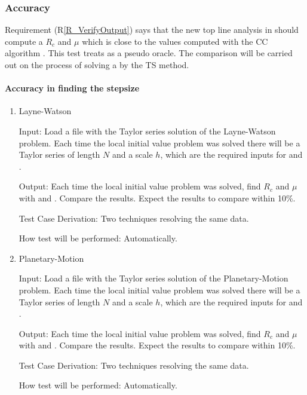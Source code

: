 \documentclass[12pt, titlepage]{article}
\newcommand{\rref}[1]{(R\ref{#1})}
\begin{document}
\subsubsection{Accuracy}

Requirement \rref{R_VerifyOutput} says that the new top line
analysis in  should compute a $R_c$ and $\mu$ which is
close to the values computed with the CC algorithm \rdcon.
This test treats \rdcon as a pseudo oracle.
The comparison will be carried out on the process of solving a \dae \ivp by the TS method.

\paragraph{Accuracy in finding the stepsize}

\begin{enumerate}

\item{Layne-Watson\\}

					
					
Input: Load a file with the Taylor series solution of the Layne-Watson problem. Each time the
    local initial value problem was solved there will be a Taylor series of length $N$ and a scale $h$,
    which are the required inputs for  and \rdcon.
					
Output: Each time the local initial value problem was solved, find $R_c$ and $\mu$ with
     and \rdcon. Compare the results. Expect the results to compare within 10\%.

Test Case Derivation: Two techniques resolving the same data.
					
How test will be performed: Automatically.
					
\item{Planetary-Motion\\}

					
					
Input: Load a file with the Taylor series solution of the Planetary-Motion problem. Each time the
    local initial value problem was solved there will be a Taylor series of length $N$ and a scale $h$,
    which are the required inputs for  and \rdcon.
					
Output: Each time the local initial value problem was solved, find $R_c$ and $\mu$ with
     and \rdcon. Compare the results. Expect the results to compare within 10\%.

Test Case Derivation: Two techniques resolving the same data.
					
How test will be performed: Automatically.

\end{enumerate}
\end{document}
